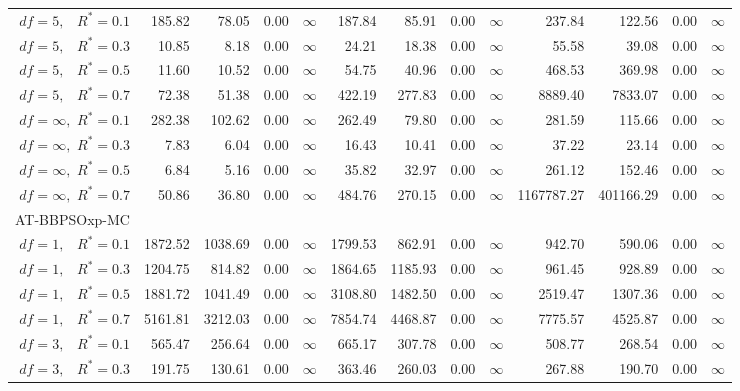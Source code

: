 \documentclass[12pt]{article}
\begin{document}
\begin{table}[ht]
{\begin{tabular}{r|rrrr|rrrr|rrrr}
  $df = 5,\enspace$ $R^* =0.1$ & 185.82 & 78.05 & 0.00 & $\infty$ & 187.84 & 85.91 & 0.00 & $\infty$ & 237.84 & 122.56 & 0.00 & $\infty$ \\ 
  $df = 5,\enspace$ $R^* =0.3$ & 10.85 & 8.18 & 0.00 & $\infty$ & 24.21 & 18.38 & 0.00 & $\infty$ & 55.58 & 39.08 & 0.00 & $\infty$ \\ 
  $df = 5,\enspace$ $R^* =0.5$ & 11.60 & 10.52 & 0.00 & $\infty$ & 54.75 & 40.96 & 0.00 & $\infty$ & 468.53 & 369.98 & 0.00 & $\infty$ \\ 
  $df = 5,\enspace$ $R^* =0.7$ & 72.38 & 51.38 & 0.00 & $\infty$ & 422.19 & 277.83 & 0.00 & $\infty$ & 8889.40 & 7833.07 & 0.00 & $\infty$ \\ 
  $df = \infty,$ $R^* =0.1$ & 282.38 & 102.62 & 0.00 & $\infty$ & 262.49 & 79.80 & 0.00 & $\infty$ & 281.59 & 115.66 & 0.00 & $\infty$ \\ 
  $df = \infty,$ $R^* =0.3$ & 7.83 & 6.04 & 0.00 & $\infty$ & 16.43 & 10.41 & 0.00 & $\infty$ & 37.22 & 23.14 & 0.00 & $\infty$ \\ 
  $df = \infty,$ $R^* =0.5$ & 6.84 & 5.16 & 0.00 & $\infty$ & 35.82 & 32.97 & 0.00 & $\infty$ & 261.12 & 152.46 & 0.00 & $\infty$ \\ 
  $df = \infty,$ $R^* =0.7$ & 50.86 & 36.80 & 0.00 & $\infty$ & 484.76 & 270.15 & 0.00 & $\infty$ & 1167787.27 & 401166.29 & 0.00 & $\infty$ \\ 
\hline
\multicolumn{1}{l|}{AT-BBPSOxp-MC} &&&&&&&&&&&&\\
  $df = 1,\enspace$ $R^* =0.1$ & 1872.52 & 1038.69 & 0.00 & $\infty$ & 1799.53 & 862.91 & 0.00 & $\infty$ & 942.70 & 590.06 & 0.00 & $\infty$ \\ 
  $df = 1,\enspace$ $R^* =0.3$ & 1204.75 & 814.82 & 0.00 & $\infty$ & 1864.65 & 1185.93 & 0.00 & $\infty$ & 961.45 & 928.89 & 0.00 & $\infty$ \\ 
  $df = 1,\enspace$ $R^* =0.5$ & 1881.72 & 1041.49 & 0.00 & $\infty$ & 3108.80 & 1482.50 & 0.00 & $\infty$ & 2519.47 & 1307.36 & 0.00 & $\infty$ \\ 
  $df = 1,\enspace$ $R^* =0.7$ & 5161.81 & 3212.03 & 0.00 & $\infty$ & 7854.74 & 4468.87 & 0.00 & $\infty$ & 7775.57 & 4525.87 & 0.00 & $\infty$ \\ 
  $df = 3,\enspace$ $R^* =0.1$ & 565.47 & 256.64 & 0.00 & $\infty$ & 665.17 & 307.78 & 0.00 & $\infty$ & 508.77 & 268.54 & 0.00 & $\infty$ \\ 
  $df = 3,\enspace$ $R^* =0.3$ & 191.75 & 130.61 & 0.00 & $\infty$ & 363.46 & 260.03 & 0.00 & $\infty$ & 267.88 & 190.70 & 0.00 & $\infty$ \\ 

\end{tabular}}
\end{table}
\end{document}
